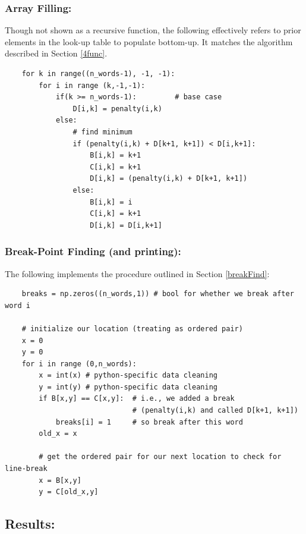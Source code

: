\documentclass[conference]{styles/acmsiggraph}
\newcommand{\?}{\stackrel{?}{=}}
\begin{document}
\subsubsection*{Array Filling:}
Though not shown as a recursive function, the following effectively refers to prior elements in the look-up table to populate bottom-up.  It matches the algorithm described in Section \ref{4func}.
\begin{verbatim}
    for k in range((n_words-1), -1, -1):
        for i in range (k,-1,-1):
            if(k >= n_words-1):         # base case
                D[i,k] = penalty(i,k)
            else:
                # find minimum
                if (penalty(i,k) + D[k+1, k+1]) < D[i,k+1]:
                    B[i,k] = k+1
                    C[i,k] = k+1
                    D[i,k] = (penalty(i,k) + D[k+1, k+1])
                else:
                    B[i,k] = i
                    C[i,k] = k+1
                    D[i,k] = D[i,k+1]
\end{verbatim}


\subsubsection*{Break-Point Finding (and printing):}
The following implements the procedure outlined in Section \ref{breakFind}:
\begin{verbatim}
    breaks = np.zeros((n_words,1)) # bool for whether we break after word i

    # initialize our location (treating as ordered pair)
    x = 0 
    y = 0
    for i in range (0,n_words):
        x = int(x) # python-specific data cleaning
        y = int(y) # python-specific data cleaning
        if B[x,y] == C[x,y]:  # i.e., we added a break
                              # (penalty(i,k) and called D[k+1, k+1])
            breaks[i] = 1     # so break after this word
        old_x = x
        
        # get the ordered pair for our next location to check for line-break
        x = B[x,y]
        y = C[old_x,y]
\end{verbatim}


\subsection{Results:}
\end{document}
